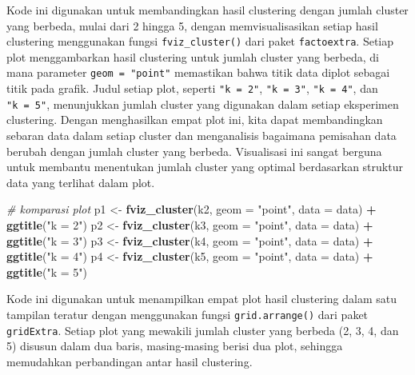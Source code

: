\documentclass[
  oneside]{book}
\newenvironment{Shaded}{\begin{snugshade}}{\end{snugshade}}
\newcommand{\AttributeTok}[1]{\textcolor[rgb]{0.13,0.29,0.53}{#1}}
\newcommand{\CommentTok}[1]{\textcolor[rgb]{0.56,0.35,0.01}{\textit{#1}}}
\newcommand{\FunctionTok}[1]{\textcolor[rgb]{0.13,0.29,0.53}{\textbf{#1}}}
\newcommand{\NormalTok}[1]{#1}
\newcommand{\OtherTok}[1]{\textcolor[rgb]{0.56,0.35,0.01}{#1}}
\newcommand{\SpecialCharTok}[1]{\textcolor[rgb]{0.81,0.36,0.00}{\textbf{#1}}}
\newcommand{\StringTok}[1]{\textcolor[rgb]{0.31,0.60,0.02}{#1}}
\begin{document}
Kode ini digunakan untuk membandingkan hasil clustering dengan jumlah cluster yang berbeda, mulai dari 2 hingga 5, dengan memvisualisasikan setiap hasil clustering menggunakan fungsi \texttt{fviz\_cluster()} dari paket \texttt{factoextra}. Setiap plot menggambarkan hasil clustering untuk jumlah cluster yang berbeda, di mana parameter \texttt{geom\ =\ "point"} memastikan bahwa titik data diplot sebagai titik pada grafik. Judul setiap plot, seperti \texttt{"k\ =\ 2"}, \texttt{"k\ =\ 3"}, \texttt{"k\ =\ 4"}, dan \texttt{"k\ =\ 5"}, menunjukkan jumlah cluster yang digunakan dalam setiap eksperimen clustering. Dengan menghasilkan empat plot ini, kita dapat membandingkan sebaran data dalam setiap cluster dan menganalisis bagaimana pemisahan data berubah dengan jumlah cluster yang berbeda. Visualisasi ini sangat berguna untuk membantu menentukan jumlah cluster yang optimal berdasarkan struktur data yang terlihat dalam plot.

\begin{Shaded}
\begin{Highlighting}[]
\CommentTok{\# komparasi plot}
\NormalTok{p1 }\OtherTok{\textless{}{-}} \FunctionTok{fviz\_cluster}\NormalTok{(k2, }\AttributeTok{geom =} \StringTok{"point"}\NormalTok{, }\AttributeTok{data =}\NormalTok{ data) }\SpecialCharTok{+} \FunctionTok{ggtitle}\NormalTok{(}\StringTok{"k = 2"}\NormalTok{)}
\NormalTok{p2 }\OtherTok{\textless{}{-}} \FunctionTok{fviz\_cluster}\NormalTok{(k3, }\AttributeTok{geom =} \StringTok{"point"}\NormalTok{,  }\AttributeTok{data =}\NormalTok{ data) }\SpecialCharTok{+} \FunctionTok{ggtitle}\NormalTok{(}\StringTok{"k = 3"}\NormalTok{)}
\NormalTok{p3 }\OtherTok{\textless{}{-}} \FunctionTok{fviz\_cluster}\NormalTok{(k4, }\AttributeTok{geom =} \StringTok{"point"}\NormalTok{,  }\AttributeTok{data =}\NormalTok{ data) }\SpecialCharTok{+} \FunctionTok{ggtitle}\NormalTok{(}\StringTok{"k = 4"}\NormalTok{)}
\NormalTok{p4 }\OtherTok{\textless{}{-}} \FunctionTok{fviz\_cluster}\NormalTok{(k5, }\AttributeTok{geom =} \StringTok{"point"}\NormalTok{,  }\AttributeTok{data =}\NormalTok{ data) }\SpecialCharTok{+} \FunctionTok{ggtitle}\NormalTok{(}\StringTok{"k = 5"}\NormalTok{)}
\end{Highlighting}
\end{Shaded}

Kode ini digunakan untuk menampilkan empat plot hasil clustering dalam satu tampilan teratur dengan menggunakan fungsi \texttt{grid.arrange()} dari paket \texttt{gridExtra}. Setiap plot yang mewakili jumlah cluster yang berbeda (2, 3, 4, dan 5) disusun dalam dua baris, masing-masing berisi dua plot, sehingga memudahkan perbandingan antar hasil clustering.
\end{document}
